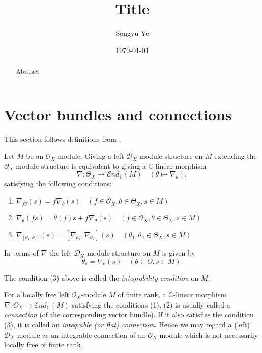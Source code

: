 \documentclass[12pt]{article}
\begin{document}
\rhead{\today}
\cfoot{\thepage}

\title{Title}

\author{Songyu Ye}
\date{\today}
\maketitle


\begin{abstract}
	Abstract
\end{abstract}

\tableofcontents

\section{Vector bundles and connections}
This section follows definitions from \cite{hotta_takeuchi_tanisaki_d_modules_2008}.
\begin{lemma}
	Let \( M \) be an \( \mathcal{O}_X \)-module. Giving a left \( \mathcal{D}_X \)-module structure on \( M \) extending the \( \mathcal{O}_X \)-module structure is equivalent to giving a \( \mathbb{C} \)-linear morphism
	\[
		\nabla : \Theta_X \rightarrow \mathcal{E}nd_{\mathbb{C}}(M) \quad (\theta \mapsto \nabla_\theta),
	\]
	satisfying the following conditions:
	\begin{enumerate}
		\item
		      $\nabla_{f\theta}(s) = f\nabla_{\theta}(s) \quad (f \in \mathcal{O}_X, \theta \in \Theta_X, s \in M)$

		\item
		      $\nabla_{\theta}(fs) = \theta(f)s + f\nabla_{\theta}(s) \quad (f \in \mathcal{O}_X, \theta \in \Theta_X, s \in M)$
		\item
		      $\nabla_{[\theta_1,\theta_2]}(s) = [\nabla_{\theta_1}, \nabla_{\theta_2}](s) \quad (\theta_1, \theta_2 \in \Theta_X, s \in M)$
	\end{enumerate}
	In terms of \(\nabla\) the left \( \mathcal{D}_X \)-module structure on \( M \) is given by
	\[
		\theta_s = \nabla_{\theta}(s) \quad (\theta \in \Theta, s \in M).
	\]
\end{lemma}


The condition (3) above is called the \emph{integrability condition} on \( M \).

For a locally free left \( \mathcal{O}_X \)-module \( M \) of finite rank, a \( \mathbb{C} \)-linear morphism \(\nabla : \Theta_X \rightarrow \mathcal{E}nd_{\mathbb{C}}(M) \) satisfying the conditions (1), (2) is usually called a \emph{connection} (of the corresponding vector bundle). If it also satisfies the condition (3), it is called an \emph{integrable (or flat) connection}. Hence we may regard a (left) \( \mathcal{D}_X \)-module as an integrable connection of an \( \mathcal{O}_X \)-module which is not necessarily locally free of finite rank.
\end{document}
